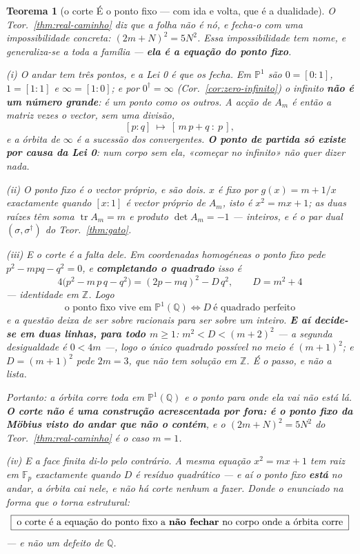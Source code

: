 \documentclass[11pt,a4paper]{article}
\newtheorem{teorema}{Teorema}
\begin{document}
\begin{teorema}[o corte É o ponto fixo --- com ida e volta, que é a
dualidade]\label{thm:corte-ponto-fixo}
O Teor.~\ref{thm:real-caminho} diz que \emph{a folha não é nó}, e fecha-o com uma
impossibilidade concreta: $(2m+N)^{2}=5N^{2}$. Essa impossibilidade tem nome, e
generaliza-se a toda a família --- \textbf{ela é a equação do ponto fixo}.

\emph{(i) O andar tem três pontos, e a Lei 0 é que os fecha.} Em $\mathbb{P}^1$ são
$0=[0:1]$, $1=[1:1]$ e $\infty=[1:0]$; e por $0^{\dagger}=\infty$
(Cor.~\ref{cor:zero-infinito}) o infinito \textbf{não é um número grande}: é um ponto
como os outros. A acção de $A_m$ é então a matriz vezes o vector, \emph{sem uma
divisão},
\[
[p:q]\ \longmapsto\ [\,m\,p+q\ :\ p\,],
\]
e a órbita de $\infty$ é a sucessão dos convergentes. \textbf{O ponto de partida só
existe por causa da Lei 0}: num corpo sem ela, «começar no infinito» não quer dizer
nada.

\emph{(ii) O ponto fixo é o vector próprio, e são dois.} $x$ é fixo por $g(x)=m+1/x$
exactamente quando $[x:1]$ é vector próprio de $A_m$, isto é $x^{2}=mx+1$; as duas
raízes têm soma $\operatorname{tr}A_m=m$ e produto $\det A_m=-1$ --- \emph{inteiros},
e é o par dual $(\sigma,\sigma^{\dagger})$ do Teor.~\ref{thm:gato}.

\emph{(iii) E o corte é a falta dele.} Em coordenadas homogéneas o ponto fixo pede
$p^{2}-mpq-q^{2}=0$, e \textbf{completando o quadrado} isso é
\[
\boxed{\;4\bigl(p^{2}-m\,p\,q-q^{2}\bigr)=(2p-mq)^{2}-D\,q^{2},
\qquad D=m^{2}+4\;}
\]
--- identidade em $\mathbb{Z}$. Logo
\[
\boxed{\;\text{o ponto fixo vive em }\mathbb{P}^1(\mathbb{Q})
\iff D\ \text{é quadrado perfeito}\;}
\]
e a questão deixa de ser sobre racionais para ser sobre um inteiro. \textbf{E aí
decide-se em duas linhas, para todo $m\geq1$}: $m^{2}<D<(m+2)^{2}$ --- a segunda
desigualdade é $0<4m$ ---, logo o único quadrado possível no meio é $(m+1)^{2}$; e
$D=(m+1)^{2}$ pede $2m=3$, que não tem solução em $\mathbb{Z}$. \emph{É o passo, e
não a lista.}

Portanto: a órbita corre toda em $\mathbb{P}^1(\mathbb{Q})$ e o ponto para onde ela
vai não está lá. \textbf{O corte não é uma construção acrescentada por fora: é o
ponto fixo da Möbius visto do andar que não o contém}, e o
$(2m+N)^{2}=5N^{2}$ do Teor.~\ref{thm:real-caminho} é o caso $m=1$.

\emph{(iv) E a face finita di-lo pelo contrário.} A \emph{mesma} equação
$x^{2}=mx+1$ tem raiz em $\mathbb{F}_p$ exactamente quando $D$ é resíduo quadrático
--- e aí o ponto fixo \textbf{está} no andar, a órbita cai nele, e não há corte
nenhum a fazer. Donde o enunciado na forma que o torna estrutural:
\[
\boxed{\;\text{o corte é a equação do ponto fixo a \textbf{não fechar} no corpo onde
a órbita corre}\;}
\]
--- e não um defeito de $\mathbb{Q}$.


\end{teorema}
\end{document}
